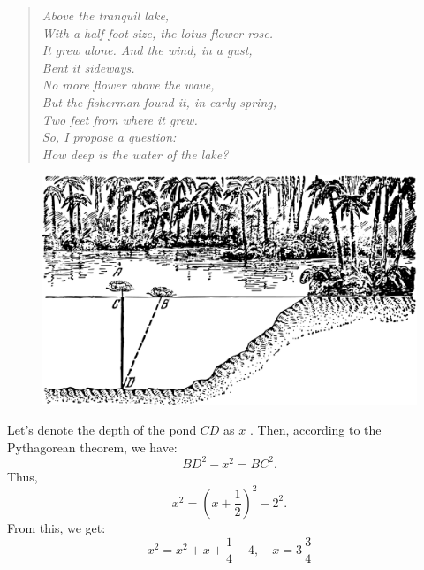 \ques 
\begin{quote}
\emph{
Above the tranquil lake, \\
With a half-foot size, the lotus flower rose. \\
It grew alone. And the wind, in a gust, \\
Bent it sideways. \\
No more flower above the wave, \\
But the fisherman found it, in early spring, \\
Two feet from where it grew.\\
So, I propose a question: \\
How deep is the water of the lake?}\\[-15pt]
\end{quote}

\begin{figure}[h!]
\centering
\includegraphics[width=\textwidth]{figures/ch-02/fig-053.pdf}
\end{figure}



\ans Let's denote the depth of the pond $CD$ as \( x \) . Then, according to the Pythagorean theorem, we have:
\begin{equation*}%
BD^{2} - x^{2} = BC^{2}.
\end{equation*}
Thus, 
\begin{equation*}%
x^{2} = \left( x + \frac{1}{2} \right)^{2} - 2^{2}.
\end{equation*}
From this, we get:
\begin{equation*}%
x^{2} = x^{2}  + x + \frac{1}{4} - 4 , \quad x = 3\,\frac{3}{4}
\end{equation*}

